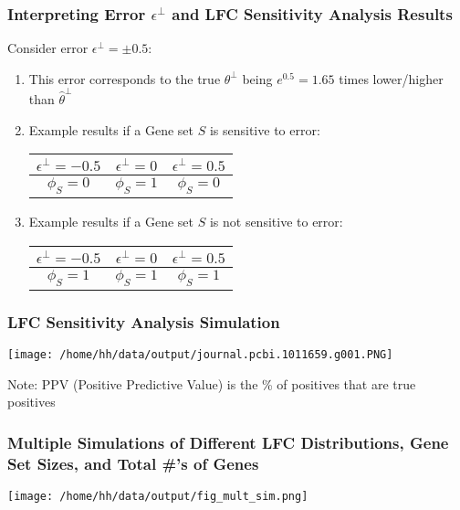 \documentclass[11pt]{beamer}
\begin{document}
\begin{frame}
  \frametitle{Interpreting Error \(\epsilon^\perp\) and LFC Sensitivity Analysis Results}

  Consider error \(\epsilon^\perp = \pm 0.5\):
  \begin{enumerate}
  \item This error corresponds to the true \(\theta^\perp\) being \(e^{0.5}=1.65\) times lower/higher than \(\hat{\theta}^\perp\)
    \pause
    \item Example results if a Gene set \(S\) is sensitive to error:
      \begin{center}
        \begin{tabular}{ |c|c|c| } 
        \hline
        \(\epsilon^\perp=-0.5\) & \(\epsilon^\perp=0\) & \(\epsilon^\perp=0.5\) \\
        \hline
        \(\phi_S=0\) & \(\phi_S=1\) & \(\phi_S=0\) \\
        \hline
        \end{tabular}
      \end{center}
    \pause
    \item Example results if a Gene set \(S\) is not sensitive to error:
      \begin{center}
        \begin{tabular}{ |c|c|c| }
        \hline
        \(\epsilon^\perp=-0.5\) & \(\epsilon^\perp=0\) & \(\epsilon^\perp=0.5\) \\
        \hline
        \(\phi_S=1\) & \(\phi_S=1\) & \(\phi_S=1\) \\
        \hline
        \end{tabular}
      \end{center}
  \end{enumerate}
\end{frame}

\begin{frame}
  \frametitle{LFC Sensitivity Analysis Simulation}
  
  \begin{center}
    \texttt{[image: /home/hh/data/output/journal.pcbi.1011659.g001.PNG]}
  \end{center}

  Note: PPV (Positive Predictive Value) is the \% of positives that are true positives
 
\end{frame}

\begin{frame}
  \frametitle{Multiple Simulations of Different LFC Distributions, Gene Set Sizes, and Total \#'s of Genes}
  \begin{center}
    \texttt{[image: /home/hh/data/output/fig\_mult\_sim.png]}
  \end{center}
\end{frame}
  
\end{document}
